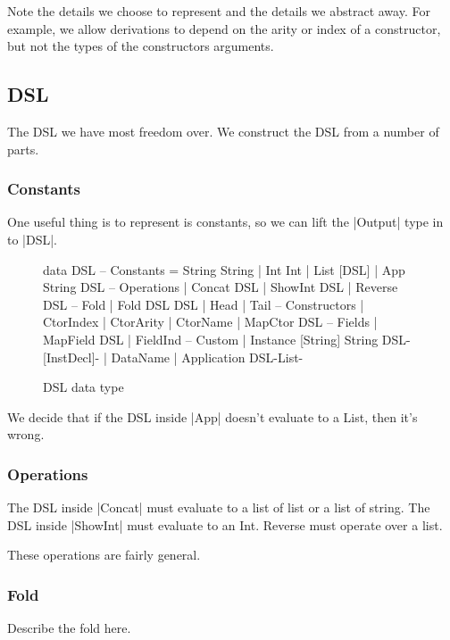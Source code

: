 \documentclass[preprint]{sigplanconf}
\begin{document}
Note the details we choose to represent and the details we abstract away. For example, we allow derivations to depend on the arity or index of a constructor, but not the types of the constructors arguments.

\subsection{DSL}

The DSL we have most freedom over. We construct the DSL from a number of parts.

\subsubsection{Constants}

One useful thing is to represent is constants, so we can lift the |Output| type in to |DSL|.

\begin{figure}
\begin{code}
data DSL
    -- Constants
    = String String
    | Int Int
    | List [DSL]
    | App String DSL
    -- Operations
    | Concat DSL
    | ShowInt DSL
    | Reverse DSL
    -- Fold
    | Fold DSL DSL
    | Head
    | Tail
    -- Constructors
    | CtorIndex
    | CtorArity
    | CtorName
    | MapCtor DSL
    -- Fields
    | MapField DSL
    | FieldInd
    -- Custom
    | Instance [String] String DSL{-[InstDecl]-}
    | DataName
    | Application DSL{-List-}
\end{code}
\caption{DSL data type}
\end{figure}

We decide that if the DSL inside |App| doesn't evaluate to a List, then it's wrong.

\subsubsection{Operations}

The DSL inside |Concat| must evaluate to a list of list or a list of string. The DSL inside |ShowInt| must evaluate to an Int. Reverse must operate over a list.

These operations are fairly general.

\subsubsection{Fold}

Describe the fold here.
\end{document}
